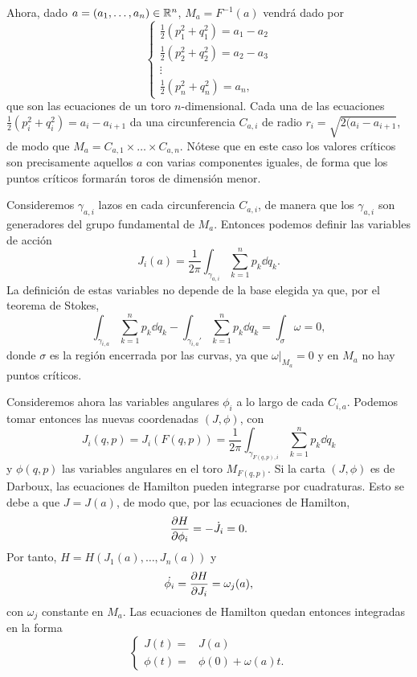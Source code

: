   Ahora, dado $a=(a_1,\dots,a_n)\in \mathbb{R}^n$, $M_a=F^{-1}(a)$ vendrá dado por 
  \begin{equation*}
    \left\lbrace
    \begin{array}{l}
      \tfrac{1}{2}(p_1^2+q_1^2)=a_1-a_2 \\
      \tfrac{1}{2}(p_2^2+q_2^2)=a_2-a_3 \\
\vdots \\
\tfrac{1}{2}(p_n^2+q_n^2)=a_n, 
    \end{array}
    \right.
  \end{equation*}
  que son las ecuaciones de un toro $n$-dimensional. Cada una de las ecuaciones $\frac{1}{2}(p_i^2+q_i^2)=a_i-a_{i+1}$ da una circunferencia $C_{a,i}$ de radio $r_i=\sqrt{2(a_i-a_{i+1}}$, de modo que $M_a=C_{a,1}\times\dots\times C_{a,n}$. Nótese que en este caso los valores críticos son precisamente aquellos $a$ con varias componentes iguales, de forma que los puntos críticos formarán toros de dimensión menor.

  Consideremos $\gamma_{a,i}$ lazos en cada circunferencia $C_{a,i}$, de manera que los $\gamma_{a,i}$ son generadores del grupo fundamental de $M_a$. Entonces podemos definir las variables de acción 
  \begin{equation*}
    J_i(a) = \frac{1}{2\pi}\int_{\gamma_{a,i}} \sum_{k=1}^n p_k \dd q_k.
  \end{equation*}
  La definición de estas variables no depende de la base elegida ya que, por el teorema de Stokes,
  \begin{equation*}
    \int_{\gamma_{i,a}} \sum_{k=1}^n p_k \dd q_k- \int_{\gamma_{i,a}'} \sum_{k=1}^n p_k \dd q_k = \int_{\sigma} \omega=0,
  \end{equation*}
  donde $\sigma$ es la región encerrada por las curvas, ya que $\omega|_{M_a}=0$ y en $M_a$ no hay puntos críticos.

  Consideremos ahora las variables angulares $\phi_i$ a lo largo de cada $C_{i,a}$. Podemos tomar entonces las nuevas coordenadas $(J,\phi)$, con
  \begin{equation*}
      J_i(q,p)=J_i(F(q,p))=\frac{1}{2\pi}\int_{\gamma_{F(q,p),i}} \sum_{k=1}^n p_k \dd q_k 
  \end{equation*}
  y $\phi(q,p)$ las variables angulares en el toro $M_{F(q,p)}$.
  Si la carta $(J,\phi)$ es de Darboux, las ecuaciones de Hamilton pueden integrarse por cuadraturas. Esto se debe a que $J=J(a)$, de modo que, por las ecuaciones de Hamilton,
\begin{equation*}
  \frac{\partial H}{\partial \phi_i}=-\dot{J_i}=0.
\end{equation*}
Por tanto, $H=H(J_1(a),\dots,J_n(a))$ y 
\begin{equation*}
  \dot{\phi_i}=\frac{\partial H}{\partial J_i} = \omega_j(a),
\end{equation*}
con $\omega_j$ constante en $M_a$. Las ecuaciones de Hamilton quedan entonces integradas en la forma
\begin{equation*}
  \begin{cases}
  J(t)= & J(a) \\
  \phi(t) = & \phi(0) + \omega(a) t.
\end{cases}
\end{equation*}


